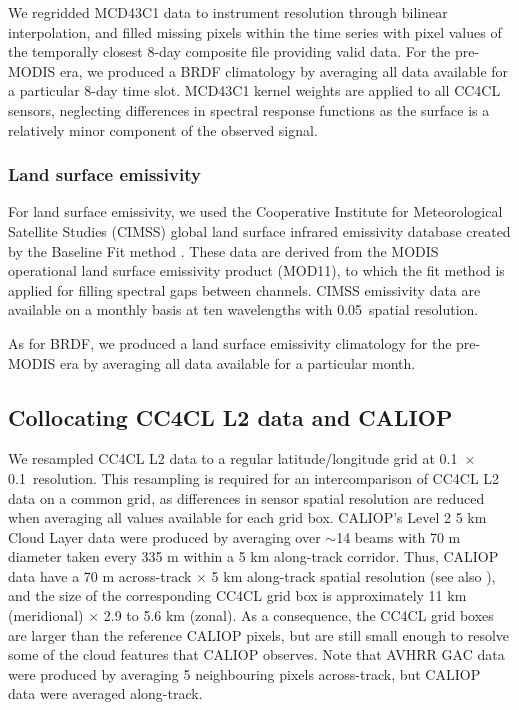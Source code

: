 We regridded MCD43C1 data to instrument resolution through bilinear interpolation, and filled missing pixels within the time series with pixel values of the temporally closest 8-day composite file providing valid data. For the pre-MODIS era, we produced a BRDF climatology by averaging all data available for a particular 8-day time slot. MCD43C1 kernel weights are applied to all CC4CL sensors, neglecting differences in spectral response functions as the surface is a relatively minor component of the observed signal. 

\subsubsection{Land surface emissivity}\label{sec:emissivity}

For land surface emissivity, we used the Cooperative Institute for Meteorological Satellite Studies (CIMSS) global land surface infrared emissivity database created by the Baseline Fit method \citep{Seemann08}. These data are derived from the MODIS operational land surface emissivity product (MOD11), to which the fit method is applied for filling spectral gaps between channels. CIMSS emissivity data are available on a monthly basis at ten wavelengths with 0.05\textdegree\ spatial resolution.

As for BRDF, we produced a land surface emissivity climatology for the pre-MODIS era by averaging all data available for a particular month.

\subsection{Collocating CC4CL L2 data and CALIOP}

We resampled CC4CL L2 data to a regular latitude/longitude grid at 0.1\textdegree\ $\times$ 0.1\textdegree\ resolution. This resampling is required for an intercomparison of CC4CL L2 data on a common grid, as differences in sensor spatial resolution are reduced when averaging all values available for each grid box. CALIOP's Level 2 5 km Cloud Layer data were produced by averaging over $\sim$14 beams with 70 m diameter taken every 335 m within a 5 km along-track corridor. Thus, CALIOP data have a 70 m across-track $\times$ 5 km along-track spatial resolution (see also \citet{Holz08}), and the size of the corresponding CC4CL grid box is approximately 11 km (meridional) $\times$ 2.9 to 5.6 km (zonal). As a consequence, the CC4CL grid boxes are larger than the reference CALIOP pixels, but are still small enough to resolve some of the cloud features that CALIOP observes. Note that AVHRR GAC data were produced by averaging 5 neighbouring pixels across-track, but CALIOP data were averaged along-track.

